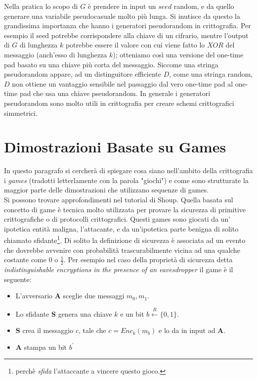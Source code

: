 \documentclass[a4paper,openright,twoside,12pt]{report}
\begin{document}
Nella pratica lo scopo di $G$ \`e prendere in input un $seed$ random, e da quello generare una variabile pseudocasuale molto pi\`u lunga. Si inutisce da questo la grandissima
importanza che hanno i generatori pseudorandom in crittografia. Per esempio il seed potrebbe corrispondere alla chiave di un cifrario, mentre l'output di $G$ di lunghezza $k$ potrebbe
essere il valore con cui viene fatto lo $XOR$ del messaggio (anch'esso di lunghezza $k$); otteniamo cos\`i una versione del one-time pad basato su una chiave pi\`u corta del messaggio.
Siccome una stringa pseudorandom appare, ad un distinguitore efficiente $D$, come una stringa random, $D$ non ottiene un vantaggio sensibile nel passaggio dal vero one-time pad
al one-time pad che usa una chiave pseudorandom. In generale i generatori pseudorandom sono molto utili in crittografia per creare schemi crittografici simmetrici.


\newpage
\section{Dimostrazioni Basate su Games}
In questo paragrafo si cercher\`a di spiegare cosa siano nell'ambito della crittografia i \emph{games} (tradotti letterlamente con la parola "giochi") e come sono strutturate la maggior parte delle dimostrazioni
che utilizzano sequenze di games.\\Si possono trovare approfondimenti nel tutorial di Shoup\cite{shoup}.
Quella basata sul concetto di game \`e tecnica molto utilizzata per provare la sicurezza di primitive crittografiche o di protocolli crittografici.
Questi games sono giocati da un' ipotetica entit\`a maligna, l'attacante, e da un'ipotetica parte benigna di solito chiamato sfidante\footnote{perch\`e \emph{sfida} l'attaccante a 
vincere questo gioco.}. Di solito la definizione di sicurezza \`e associata ad un evento che dovrebbe avvenire con probabilit\`a trascurabilmente vicina ad una qualche costante come 
$0$ o $\frac{1}{2}$. Per esempio nel caso della propriet\`a di sicurezza detta \emph{indistinguishable encryptions in the presence of an eavesdropper} il game \`e il seguente:
\begin{itemize}
 \item L'avversario \textbf{A} sceglie due messaggi $m_0, m_1$.
 \item Lo sfidante \textbf{S} genera una chiave $k$ e un bit $b \xleftarrow{R} \{0,1\}$.
 \item \textbf{S} crea il messaggio $c$, tale che $c= Enc_k(m_b)$ e lo da in input ad \textbf{A}.
 \item \textbf{A} stampa un bit $b^{'}$
\end{itemize}
\end{document}
